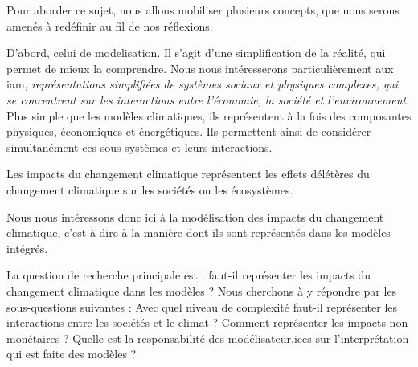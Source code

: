 
Pour aborder ce sujet, nous allons mobiliser plusieurs concepts, que nous serons amenés à redéfinir au fil de nos réflexions. 


D'abord, celui de \gls{modelisation}. Il s'agit d'une simplification de la réalité, qui permet de mieux la comprendre. Nous nous intéresserons particulièrement aux \gls{iam}, \textit{représentations simplifiées de systèmes sociaux et physiques complexes, qui se concentrent sur les interactions entre l'économie, la société et l'environnement}. Plus simple que les modèles climatiques, ils représentent à la fois des composantes physiques, économiques et énergétiques. Ils permettent ainsi de considérer simultanément ces sous-systèmes et leurs interactions. 


Les impacts du changement climatique représentent les effets délétères du changement climatique sur les sociétés ou les écosystèmes. 





Nous nous intéressons donc ici à la modélisation des impacts du changement climatique, c'est-à-dire à la manière dont ils sont représentés dans les modèles intégrés. 


La question de recherche principale est : faut-il représenter les impacts du changement climatique dans les modèles ? Nous cherchons à y répondre par les sous-questions suivantes : Avec quel niveau de complexité faut-il représenter les interactions entre les sociétés et le climat ? Comment représenter les impacts-non monétaires ? Quelle est la responsabilité des modélisateur.ices sur l'interprétation qui est faite des modèles ? 



